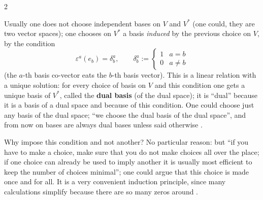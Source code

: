 \begin{paracol}{2}
\begin{definition}\label{def:te-dualbasis}
Usually one does not choose independent bases on $V$ and $V^*$ (one could, they are two vector spaces); one chooses on $V^*$ a basis \emph{induced} by the previous choice on $V$, by the condition
\[
  \varepsilon^a(e_b)=\delta^a_b,\qquad\delta^a_b:=\begin{cases}1&a=b\\0&a\ne b\end{cases}
\]
(the $a$-th basis co-vector eats the $b$-th basis vector). This is a linear relation with a unique solution: for every choice of basis on $V$ and this condition one gets a unique basis of $V^*$, called the \textbf{dual basis} (of the dual space); it is ``dual'' because it is a basis of a dual space and
because of this condition. One could choose just any basis of the dual space; ``we choose the dual basis of the dual space'', and from now on bases are always dual bases unless said otherwise .
\end{definition}
Why impose this condition and not another? No particular reason: but ``if you have to make a choice, make sure that you do not make choices all over the place; if one choice can already be used to imply another it is usually most efficient to keep the number of choices minimal''; one could argue that this
choice is made once and for all. It is a very convenient induction principle, since many calculations simplify because there are so many zeros around .


\end{paracol}

